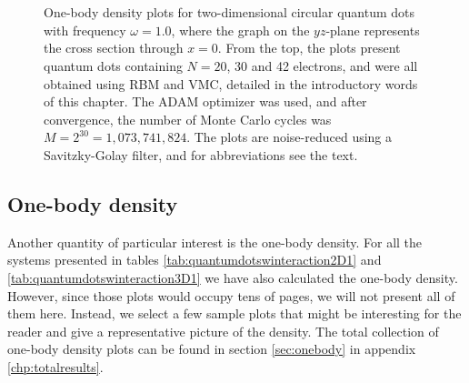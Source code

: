 \begin{figure}
	\centering
	\captionsetup[subfigure]{labelformat=empty}
	\hspace{0.1cm}
	\hspace{-0.0cm}
	\\
	
	\hspace{0.1cm}
	\hspace{-0.0cm}
	\\
	
	\hspace{0.1cm}
	\hspace{-0.0cm}
	
	\caption{One-body density plots for two-dimensional circular quantum dots with frequency $\omega=1.0$, where the graph on the $yz$-plane represents the cross section through $x=0$. From the top, the plots present quantum dots containing $N=20$, 30 and 42 electrons, and were all obtained using RBM and VMC, detailed in the introductory words of this chapter. The ADAM optimizer was used, and after convergence, the number of Monte Carlo cycles was $M=2^{30}=1,073,741,824$. The plots are noise-reduced using a Savitzky-Golay filter, and for abbreviations see the text.}
	\label{fig:OB_interaction_1p0w2}
\end{figure}

\subsection{One-body density} \label{sec:onebodyresults}
Another quantity of particular interest is the one-body density. For all the systems presented in tables \eqref{tab:quantumdotswinteraction2D1} and \eqref{tab:quantumdotswinteraction3D1} we have also calculated the one-body density. However, since those plots would occupy tens of pages, we will not present all of them here. Instead, we select a few sample plots that might be interesting for the reader and give a representative picture of the density. The total collection of one-body density plots can be found in section \ref{sec:onebody} in appendix \ref{chp:totalresults}. 

